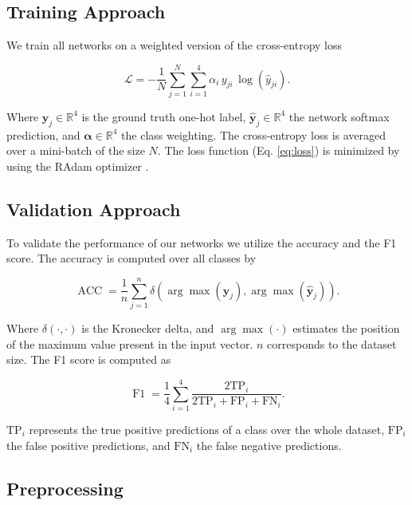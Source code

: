 \subsection{Training Approach} \label{subsec:training}

We train all networks on a weighted version of the cross-entropy loss \cite{Goodfellow2016}

\begin{equation} \label{eq:loss}
    \mathcal{L} = -\frac{1}{N}\sum_{j=1}^{N}\sum_{i=1}^{4}\alpha_{i}\,y_{ji}\,\log(\hat{y}_{ji}).
\end{equation}

Where $\mathbf{y}_{j}\in\mathbb{R}^4$ is the ground truth one-hot label, $\hat{\mathbf{y}}_{j}\in\mathbb{R}^4$ the network softmax prediction, and $\mathbf{\alpha}\in\mathbb{R}^4$ the class weighting. The cross-entropy loss is averaged over a mini-batch of the size $N$. The loss function (Eq. \ref{eq:loss}) is minimized by using the RAdam optimizer \cite{Liu2020}.

\subsection{Validation Approach} \label{subsec:validation}

To validate the performance of our networks we utilize the accuracy and the F1 score. The accuracy is computed over all classes by

\begin{equation}\label{eq:acc}
    \operatorname{ACC}=\frac{1}{n}\sum_{j=1}^{n}\delta\left(\arg\max(\mathbf{y}_{j}), \arg\max(\hat{\mathbf{y}}_{j})\right).
\end{equation}

Where $\delta(\cdot, \cdot)$ is the Kronecker delta, and $\arg\max(\cdot)$ estimates the position of the maximum value present in the input vector. $n$ corresponds to the dataset size. The F1 score is computed as

\begin{equation}\label{eq:f1}
    \operatorname{F1}=\frac{1}{4}\sum_{i=1}^{4}\frac{2\text{TP}_{i}}{2\text{TP}_{i} + \text{FP}_{i} + \text{FN}_{i}}.
\end{equation}

$\text{TP}_{i}$ represents the true positive predictions of a class over the whole dataset, $\text{FP}_{i}$ the false positive predictions, and $\text{FN}_{i}$ the false negative predictions.

\subsection{Preprocessing} \label{subsec:preprocessing}

